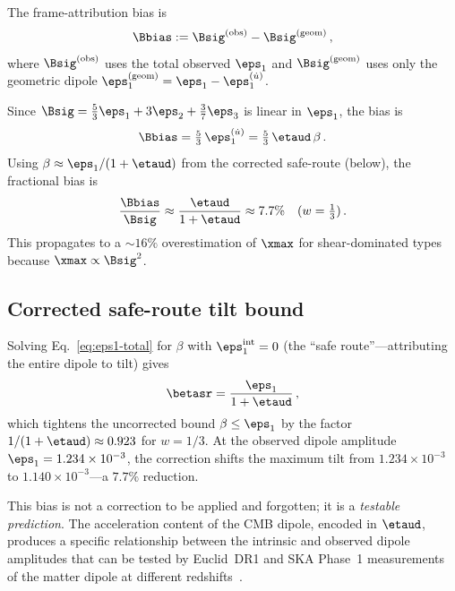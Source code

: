 \begin{definition}
\label{def:frame-bias}
The frame-attribution bias is
\begin{equation}\label{eq:frame-bias}
\Bbias := \Bsig^{(\mathrm{obs})} - \Bsig^{(\mathrm{geom})}\,,
\end{equation}
where $\Bsig^{(\mathrm{obs})}$ uses the total observed
$\eps_1$ and $\Bsig^{(\mathrm{geom})}$ uses only the
geometric dipole $\eps_1^{(\mathrm{geom})}
= \eps_1 - \eps_1^{(\dot{u})}$.
\end{definition}

Since $\Bsig = \frac{5}{3}\eps_1 + 3\eps_2 + \frac{3}{7}\eps_3$
is linear in $\eps_1$, the bias is
\begin{equation}
\Bbias = \tfrac{5}{3}\,\eps_1^{(\dot{u})}
= \tfrac{5}{3}\,\etaud\,\beta\,.
\end{equation}
Using $\beta \approx \eps_1/(1+\etaud)$ from the corrected
safe-route (below), the fractional bias is
\begin{equation}
\frac{\Bbias}{\Bsig}
\approx \frac{\etaud}{1 + \etaud}
\approx 7.7\% \quad (w = \tfrac{1}{3})\,.
\end{equation}
This propagates to a $\sim 16\%$ overestimation of $\xmax$ for
shear-dominated types because $\xmax \propto \Bsig^2$.

\subsection{Corrected safe-route tilt bound}
\label{sec:safe-route}

Solving Eq.~\eqref{eq:eps1-total} for $\beta$ with
$\eps_1^{\mathrm{int}} = 0$ (the ``safe route''---attributing
the entire dipole to tilt) gives
\begin{equation}\label{eq:beta-sr}
\betasr = \frac{\eps_1}{1 + \etaud}\,,
\end{equation}
which tightens the uncorrected bound $\beta \leq \eps_1$ by
the factor $1/(1 + \etaud) \approx 0.923$ for $w = 1/3$.
At the observed dipole amplitude
$\eps_1 = 1.234 \times 10^{-3}$, the correction shifts the
maximum tilt from $1.234 \times 10^{-3}$ to
$1.140 \times 10^{-3}$---a $7.7\%$ reduction.

This bias is not a correction to be applied and forgotten;
it is a \emph{testable prediction}.  The acceleration content
of the CMB dipole, encoded in $\etaud$, produces a specific
relationship between the intrinsic and observed dipole
amplitudes that can be tested by Euclid~DR1 and SKA Phase~1
measurements of the matter dipole at different
redshifts~\cite{TsagasReview2025}.


